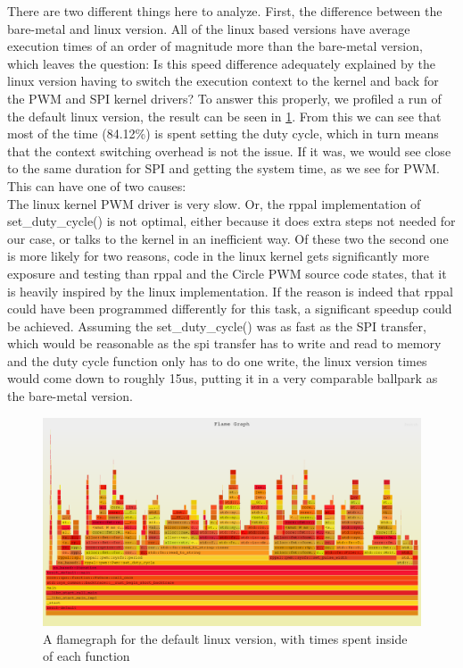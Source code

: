 There are two different things here to analyze.
First, the difference between the bare-metal and linux version.
All of the linux based versions have average execution times of an order of magnitude more than the bare-metal version,
which leaves the question:
Is this speed difference adequately explained by the linux version having to switch the execution context to the kernel and back for the PWM and SPI kernel drivers?
To answer this properly, we profiled a run of the default linux version, the result can be seen in \ref{fig:experiments:flamegraph}.
From this we can see that most of the time (84.12\%) is spent setting the duty cycle, which in turn means that the context switching overhead is not the issue.
If it was, we would see close to the same duration for SPI and getting the system time, as we see for PWM.
This can have one of two causes:\\
The linux kernel PWM driver is very slow.
Or, the rppal implementation of set\_duty\_cycle() is not optimal,
either because it does extra steps not needed for our case,
or talks to the kernel in an inefficient way.
Of these two the second one is more likely for two reasons,
code in the linux kernel gets significantly more exposure and testing than rppal and the Circle PWM source code states,
that it is heavily inspired by the linux implementation.
If the reason is indeed that rppal could have been programmed differently for this task,
a significant speedup could be achieved.
Assuming the set\_duty\_cycle() was as fast as the SPI transfer,
which would be reasonable as the spi transfer has to write and read to memory and the duty cycle function only has to do one write,
the linux version times would come down to roughly 15us,
putting it in a very comparable ballpark as the bare-metal version.

\begin{figure}
  \begin{center}
    \includegraphics[width=\textwidth]{assets/os-default/flamegraph.png}
    \caption{A flamegraph for the default linux version, with times spent inside of each function}
    \label{fig:experiments:flamegraph}
  \end{center}
\end{figure}

